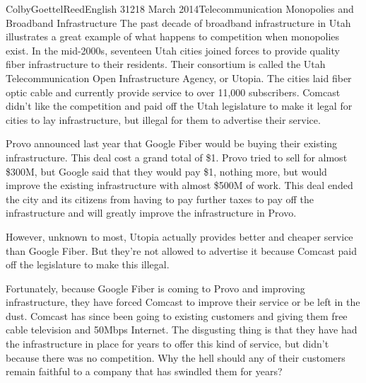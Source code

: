 \documentclass[12pt]{article}
\begin{document}
\begin{mla}{Colby}{Goettel}{Reed}{English 312}{18 March 2014}{Telecommunication Monopolies and Broadband Infrastructure}
The past decade of broadband infrastructure in Utah illustrates a great example of what happens to competition when monopolies exist. In the mid-2000s, seventeen Utah cities joined forces to provide quality fiber infrastructure to their residents. Their consortium is called the Utah Telecommunication Open Infrastructure Agency, or Utopia. The cities laid fiber optic cable and currently provide service to over 11,000 subscribers. Comcast didn't like the competition and paid off the Utah legislature to make it legal for cities to lay infrastructure, but illegal for them to advertise their service.

Provo announced last year that Google Fiber would be buying their existing infrastructure. This deal cost a grand total of \$1. Provo tried to sell for almost \$300M, but Google said that they would pay \$1, nothing more, but would improve the existing infrastructure with almost \$500M of work. This deal ended the city and its citizens from having to pay further taxes to pay off the infrastructure and will greatly improve the infrastructure in Provo.

However, unknown to most, Utopia actually provides better and cheaper service than Google Fiber. But they're not allowed to advertise it because Comcast paid off the legislature to make this illegal.

Fortunately, because Google Fiber is coming to Provo and improving infrastructure, they have forced Comcast to improve their service or be left in the dust. Comcast has since been going to existing customers and giving them free cable television and 50Mbps Internet. The disgusting thing is that they have had the infrastructure in place for years to offer this kind of service, but didn't because there was no competition. Why the hell should any of their customers remain faithful to a company that has swindled them for years?



\end{mla}
\end{document}
